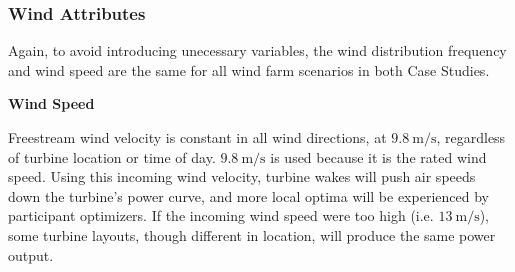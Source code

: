 




\subsubsection{Wind Attributes}

	Again, to avoid introducing unecessary variables, the wind distribution frequency and wind speed are the same for all wind farm scenarios in both Case Studies.

\vspace{3mm}
\noindent\textbf{Wind Speed}

	\noindent Freestream wind velocity is constant in all wind directions, at $9.8\ \textrm{m/s}$, regardless of turbine location or time of day.
	$9.8\ \textrm{m/s}$ is used because it is the rated wind speed.
	Using this incoming wind velocity, turbine wakes will push air speeds down the turbine's power curve, and more local optima will be experienced by participant optimizers.
	If the incoming wind speed were too high (i.e. $13\ \textrm{m/s}$), some turbine layouts, though different in location, will produce the same power output.


